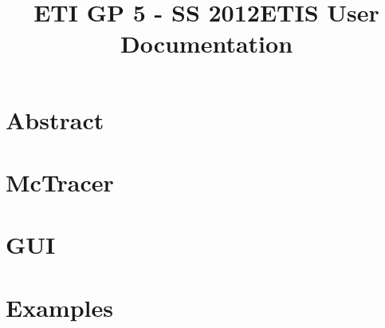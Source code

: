 \documentclass{scrartcl}
\title{ETI GP 5 - SS 2012\newline ETIS User Documentation}
\begin{document}
\maketitle
\tableofcontents
\newpage

\section{Abstract} 
\newpage
\section{McTracer} 
\newpage
\section{GUI} 
\newpage
\section{Examples} 
\end{document}
